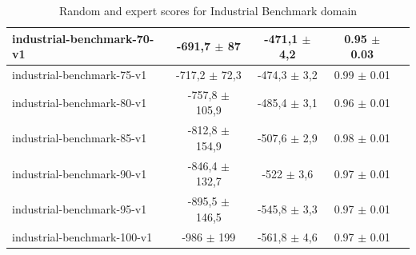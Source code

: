 \documentclass{article}
\theoremstyle{plain}
\theoremstyle{definition}
\theoremstyle{remark}
\begin{document}
\begin{table}[]
{\begin{tabular}{|l|c|c|c|c|}
industrial-benchmark-70-v1  & -691,7 $\pm$ 87    & -471,1 $\pm$ 4,2 &               0.95 $\pm$ 0.03     \\ \hline
industrial-benchmark-75-v1  & -717,2 $\pm$ 72,3  & -474,3 $\pm$ 3,2 &               0.99 $\pm$ 0.01     \\ \hline
industrial-benchmark-80-v1  & -757,8 $\pm$ 105,9 & -485,4 $\pm$ 3,1 &               0.96 $\pm$ 0.01     \\ \hline
industrial-benchmark-85-v1  & -812,8 $\pm$ 154,9 & -507,6 $\pm$ 2,9 &               0.98 $\pm$ 0.01     \\ \hline
industrial-benchmark-90-v1  & -846,4 $\pm$ 132,7 & -522 $\pm$ 3,6   &               0.97 $\pm$ 0.01     \\ \hline
industrial-benchmark-95-v1  & -895,5 $\pm$ 146,5 & -545,8 $\pm$ 3,3 &               0.97 $\pm$ 0.01     \\ \hline
industrial-benchmark-100-v1 & -986 $\pm$ 199     & -561,8 $\pm$ 4,6 &               0.97 $\pm$ 0.01     \\ \hline
\end{tabular}}
\caption{Random and expert scores for Industrial Benchmark domain}
\end{table}
\end{document}
